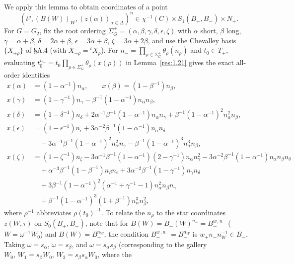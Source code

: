 \documentclass[12pt,letterpaper]{amsart}
\theoremstyle{plain}
\theoremstyle{definition}
\theoremstyle{remark}
\theoremstyle{definition}
\begin{document}
We apply this lemma to obtain coordinates of a point
\[
(t^g,(B(W))_{W},(z(\alpha))_{\alpha\in\Delta})^n\in
\chi^{-1}(C)\times S_1(B_+,B_-)\times N_+.
\]
For $G=G_2$, fix the root ordering
$\Sigma_G^+=(\alpha,\beta,\gamma,\delta,\epsilon,\zeta)$ with
$\alpha$ short, $\beta$ long, $\gamma=\alpha+\beta$, $\delta=2\alpha+\beta$,
$\epsilon=3\alpha+\beta$, $\zeta=3\alpha+2\beta$, and use the Chevalley
basis $\{X_{\pm\rho}\}$ of \S A.4 (with $X_{-\rho}={}^t X_\rho$). For
$n_-=\prod_{\rho\in\Sigma_G^+}\theta_\rho(n_\rho)$ and $t_0\in T_+$,
evaluating $t_0^{n_-}=t_0\prod_{\rho\in\Sigma_G^+}\theta_\rho(x(\rho))$ in
Lemma~\ref{res:1.21} gives the exact all-order identities
\begin{equation}\tag{1.21a}\label{eq:1.21a}
\begin{split}
x(\alpha)&=(1-\alpha^{-1})n_\alpha,\qquad
x(\beta)=(1-\beta^{-1})n_\beta,\\
x(\gamma)&=(1-\gamma^{-1})n_\gamma - \beta^{-1}(1-\alpha^{-1})n_\alpha n_\beta,\\
x(\delta)&=(1-\delta^{-1})n_\delta + 2\alpha^{-1}\beta^{-1}(1-\alpha^{-1})n_\alpha n_\gamma
+ \beta^{-1}(1-\alpha^{-1})^2 n_\alpha^2 n_\beta,\\
x(\epsilon)&=(1-\epsilon^{-1})n_\epsilon + 3\alpha^{-2}\beta^{-1}(1-\alpha^{-1})n_\alpha n_\delta\\
&\quad - 3\alpha^{-1}\beta^{-1}(1-\alpha^{-1})^2 n_\alpha^2 n_\gamma
- \beta^{-1}(1-\alpha^{-1})^3 n_\alpha^3 n_\beta,\\
x(\zeta)&=(1-\zeta^{-1})n_\zeta
- 3\alpha^{-1}\beta^{-1}(1-\alpha^{-1})(2-\gamma^{-1})n_\alpha n_\gamma^2
- 3\alpha^{-2}\beta^{-1}(1-\alpha^{-1})n_\alpha n_\beta n_\delta\\
&\quad + \alpha^{-3}\beta^{-1}(1-\beta^{-1})n_\beta n_\epsilon
+ 3\alpha^{-2}\beta^{-1}(1-\gamma^{-1})n_\gamma n_\delta\\
&\quad + 3\beta^{-1}(1-\alpha^{-1})^2(\alpha^{-1}+\gamma^{-1}-1)n_\alpha^2 n_\beta n_\gamma\\
&\quad + \beta^{-1}(1-\alpha^{-1})^3(1+\beta^{-1})n_\alpha^3 n_\beta^2,
\end{split}
\end{equation}
where $\rho^{-1}$ abbreviates $\rho(t_0)^{-1}$. To relate the $n_\rho$ to the
star coordinates $z(W,\tau)$ on $S_0(B_+,B_-)$, note that for
$B(W)=B_-(W)^{n_-}=B_-^{w_+ n_-}$ ($W=\omega^{-1}W_0$) and $B(W)=B_-^{n_W}$,
the condition $B_-^{w_+ n_-}=B_-^{n_W}$ is $w_+ n_- n_W^{-1}\in B_-$. Taking
$\omega=s_\alpha$, $\omega=s_\beta$, and $\omega=s_\alpha s_\beta$ (corresponding
to the gallery $W_0,\,W_1=s_\beta W_0,\,W_2=s_\beta s_\alpha W_0$, where the
\end{document}
